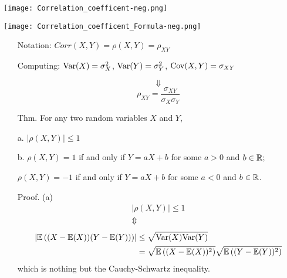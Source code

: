 \begin{frame}
	\centering
	\texttt{[image: Correlation\_coefficent-neg.png]}
\end{frame}
\begin{frame}
	\centering
	\texttt{[image: Correlation\_coefficent\_Formula-neg.png]}
\vfill

\begin{enumerate}
	\item[] Notation: $Corr(X,Y) = \rho(X,Y) = \rho_{XY}$\\[3em]
	\item[] Computing:  $\text{Var}(X) = \sigma_X^2$, $\text{Var}(Y)=\sigma_Y^2$, $\text{Cov}(X,Y)=\sigma_{XY}$
	\item[]
		\[
			\Downarrow
		\]
		\[
			\rho_{XY} = \frac{\sigma_{XY}}{\sigma_X\sigma_Y}
		\]
\end{enumerate}
\end{frame}
\begin{frame}

	\begin{enumerate}
		\item[Thm.] For any two random variables $X$ and $Y$,
		\item[a.] $|\rho(X,Y)| \le 1$
		\item[b.] $\rho(X,Y) = 1$ if and only if $Y=aX+b$ for some $a>0$ and $b\in\mathbb{R}$;
		\item[] $\rho(X,Y) = -1$ if and only if $Y=aX+b$ for some $a<0$ and $b\in\mathbb{R}$.
			\vfill
		\item[Proof.] (a)
			\begin{gather*}
				| \rho(X,Y) | \le 1 \\[1em]
				\Updownarrow
			\end{gather*}
			\begin{align*}
				\left| \mathbb{E}\left((X-\mathbb{E}(X))(Y-\mathbb{E}(Y))\right) \right| &\le \sqrt{\text{Var}(X)\text{Var}(Y)}\\
																												 &= \sqrt{\mathbb{E}\left((X-\mathbb{E}(X))^2\right)} \sqrt{\mathbb{E}\left((Y-\mathbb{E}(Y))^2\right)}
			\end{align*}
			which is nothing but the Cauchy-Schwartz inequality.
	\end{enumerate}
\end{frame}
